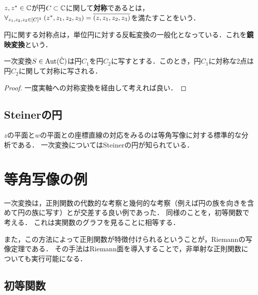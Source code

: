 \documentclass[uplatex, dvipdfmx]{jsreport}
\begin{document}
\begin{definition}
    $z,z^*\in\mathbb{C}$が円$C\subset\mathbb{C}$に関して\textbf{対称}であるとは，$\forall_{z_1,z_2,z_3\in[C]^3}\;(z^*,z_1,z_2,z_3)=\overline{(z,z_1,z_2,z_3)}$を満たすことをいう．
\end{definition}
\begin{remarks}
    円に関する対称点は，単位円に対する反転変換の一般化となっている．これを\textbf{鏡映変換}という．
\end{remarks}

\begin{theorem}[対称の原理]
    一次変換$S\in\mathrm{Aut}(\hat{\mathbb{C}})$は円$C_1$を円$C_2$に写すとする．このとき，円$C_1$に対称な2点は円$C_2$に関して対称に写される．
\end{theorem}
\begin{proof}
    一度実軸への対称変換を経由して考えれば良い．
\end{proof}

\subsection{Steinerの円}

\begin{tcolorbox}[colframe=ForestGreen, colback=ForestGreen!10!white,breakable,colbacktitle=ForestGreen!40!white,coltitle=black,fonttitle=\bfseries\sffamily,
title=]
    $z$の平面と$w$の平面との座標直線の対応をみるのは等角写像に対する標準的な分析である．
    一次変換についてはSteinerの円が知られている．
\end{tcolorbox}

\section{等角写像の例}

\begin{tcolorbox}[colframe=ForestGreen, colback=ForestGreen!10!white,breakable,colbacktitle=ForestGreen!40!white,coltitle=black,fonttitle=\bfseries\sffamily,
title=]
    一次変換は，正則関数の代数的な考察と幾何的な考察（例えば円の族を向きを含めて円の族に写す）とが交差する良い例であった．
    同様のことを，初等関数で考える．
    これは実関数のグラフを見ることに相等する．

    また，この方法によって正則関数が特徴付けられるということが，Riemannの写像定理である．
    その手法はRiemann面を導入することで，非単射な正則関数についても実行可能になる．
\end{tcolorbox}

\subsection{初等関数}
\end{document}
